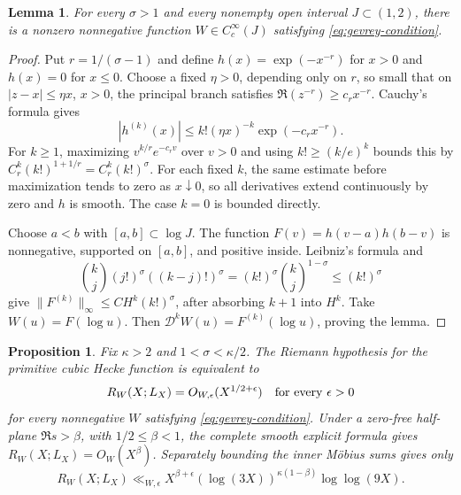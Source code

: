 \documentclass[11pt]{article}
\newtheorem{lemma}[theorem]{Lemma}
\newtheorem{proposition}[theorem]{Proposition}
\begin{document}
\begin{lemma}\label{lem:gevrey-bumps}
For every $\sigma>1$ and every nonempty open interval
$J\subset(1,2)$, there is a nonzero nonnegative function
$W\in C_c^\infty(J)$ satisfying \eqref{eq:gevrey-condition}.
\end{lemma}

\begin{proof}
Put $r=1/(\sigma-1)$ and define $h(x)=\exp(-x^{-r})$ for $x>0$
and $h(x)=0$ for $x\le0$. Choose a fixed $\eta>0$, depending
only on $r$, so small that on $|z-x|\le\eta x$, $x>0$, the
principal branch satisfies $\Re(z^{-r})\ge c_rx^{-r}$.
Cauchy's formula gives
\[
 |h^{(k)}(x)|\le k!(\eta x)^{-k}\exp(-c_rx^{-r}).
\]
For $k\ge1$, maximizing $v^{k/r}e^{-c_rv}$ over $v>0$ and
using $k!\ge(k/e)^k$ bounds this by
$C_r^k(k!)^{1+1/r}=C_r^k(k!)^\sigma$. For each fixed $k$,
the same estimate before maximization tends to zero as $x\downarrow0$,
so all derivatives extend continuously by zero and $h$ is smooth.
The case $k=0$ is bounded directly.

Choose $a<b$ with $[a,b]\subset\log J$. The function
$F(v)=h(v-a)h(b-v)$ is nonnegative, supported on $[a,b]$,
and positive inside. Leibniz's formula and
\[
 \binom{k}{j}(j!)^\sigma((k-j)!)^\sigma
 =(k!)^\sigma \binom{k}{j}^{1-\sigma}\le(k!)^\sigma
\]
give $\|F^{(k)}\|_\infty\le C H^k(k!)^\sigma$, after
absorbing $k+1$ into $H^k$. Take $W(u)=F(\log u)$.
Then $\mathcal D^kW(u)=F^{(k)}(\log u)$, proving the lemma.
\end{proof}

\begin{proposition}\label{prop:gevrey-rh}
Fix $\kappa>2$ and $1<\sigma<\kappa/2$. The Riemann hypothesis
for the primitive cubic Hecke function is equivalent to
\begin{equation}\label{eq:gevrey-rh}
 R_W(X;L_X)=O_{W,\epsilon}(X^{1/2+\epsilon})
 \quad\hbox{for every }\epsilon>0
\end{equation}
for every nonnegative $W$ satisfying \eqref{eq:gevrey-condition}.
Under a zero-free half-plane $\Re s>\beta$, with
$1/2\le\beta<1$, the complete smooth explicit formula gives
$R_W(X;L_X)=O_W(X^\beta)$. Separately bounding the inner
M\"obius sums gives only
\begin{equation}\label{eq:gevrey-separate}
 R_W(X;L_X)
 \ll_{W,\epsilon}X^{\beta+\epsilon}
        (\log(3X))^{\kappa(1-\beta)}\log\log(9X).
\end{equation}
\end{proposition}
\end{document}
